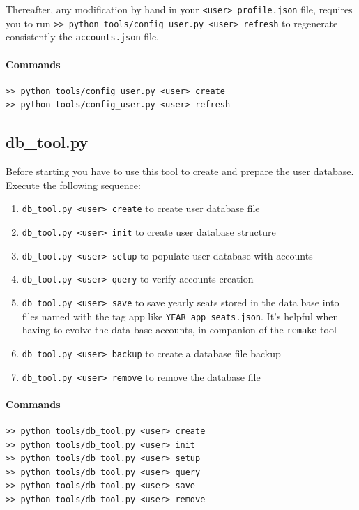 \documentclass[12pt, a4paper]{article}
\begin{document}
Thereafter, any modification by hand in your \verb!<user>_profile.json! file, requires you  to run \verb!>> python tools/config_user.py <user> refresh! to regenerate consistently the \verb!accounts.json! file. 
 
\paragraph{Commands}
\begin{verbatim}
>> python tools/config_user.py <user> create
>> python tools/config_user.py <user> refresh
\end{verbatim} 

 \subsection{db\_tool.py}
 Before starting you have to use this tool to create and prepare the user database. 
 Execute the following sequence:
 \begin{enumerate}[wide, labelwidth=!, labelindent=0pt]
 \item \verb!db_tool.py <user> create! to create user database file
 \item \verb!db_tool.py <user> init! to create user database structure		
 \item \verb!db_tool.py <user> setup!	 to populate user database with accounts
 \item \verb!db_tool.py <user> query! to verify accounts creation
 \item \verb!db_tool.py <user> save! to save yearly seats stored in the data base into files named with the tag \textsf{app} like \verb!YEAR_app_seats.json!. It's helpful when having to evolve the data base accounts, in companion of the \verb!remake! tool
 \item \verb!db_tool.py <user> backup! to create a database file backup
 \item \verb!db_tool.py <user> remove! to remove the database file
\end{enumerate}
\paragraph{Commands}
\begin{verbatim}
>> python tools/db_tool.py <user> create
>> python tools/db_tool.py <user> init
>> python tools/db_tool.py <user> setup
>> python tools/db_tool.py <user> query
>> python tools/db_tool.py <user> save 
>> python tools/db_tool.py <user> remove
\end{verbatim}
\end{document}
